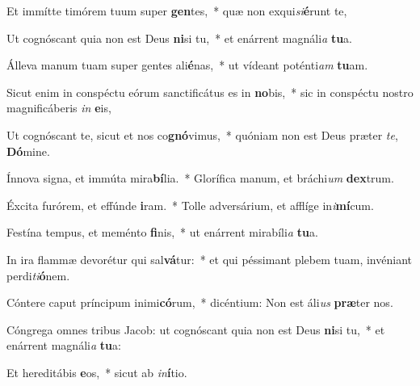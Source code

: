 \item Et immítte timórem tuum super \textbf{gen}tes,~* quæ non exqui\textit{si}\textbf{é}runt te,
\item Ut cognóscant quia non est Deus \textbf{ni}si tu,~* et enárrent magnáli\textit{a} \textbf{tu}a.
\item Álleva manum tuam super gentes ali\textbf{é}nas,~* ut vídeant poténti\textit{am} \textbf{tu}am.
\item Sicut enim in conspéctu eórum sanctificátus es in \textbf{no}bis,~* sic in conspéctu nostro magnificáberis \textit{in} \textbf{e}is,
\item Ut cognóscant te, sicut et nos co\textbf{gnó}vimus,~* quóniam non est Deus præter \textit{te}, \textbf{Dó}mine.
\item Ínnova signa, et immúta mira\textbf{bí}lia.~* Glorífica manum, et bráchi\textit{um} \textbf{dex}trum.
\item Éxcita furórem, et effúnde \textbf{i}ram.~* Tolle adversárium, et afflíge in\textit{i}\textbf{mí}cum.
\item Festína tempus, et meménto \textbf{fi}nis,~* ut enárrent mirabíli\textit{a} \textbf{tu}a.
\item In ira flammæ devorétur qui sal\textbf{vá}tur:~* et qui péssimant plebem tuam, invéniant perdi\textit{ti}\textbf{ó}nem.
\item Cóntere caput príncipum inimi\textbf{có}rum,~* dicéntium: Non est áli\textit{us} \textbf{præ}ter nos.
\item Cóngrega omnes tribus Jacob: ut cognóscant quia non est Deus \textbf{ni}si tu,~* et enárrent magnáli\textit{a} \textbf{tu}a:
\item Et hereditábis \textbf{e}os,~* sicut ab \textit{in}\textbf{í}tio.
